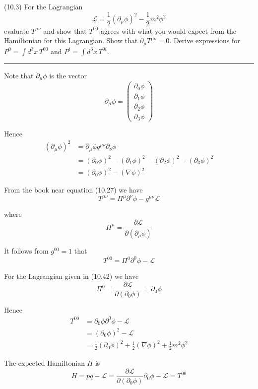 \documentclass[12pt]{article}
\begin{document}
(10.3)
For the Lagrangian
\begin{equation*}
\mathcal L=\frac{1}{2}(\partial_\mu\phi)^2-\frac{1}{2}m^2\phi^2
\tag{10.42}
\end{equation*}
evaluate $T^{\mu\nu}$ and show that $T^{00}$ agrees with what
you would expect from the Hamiltonian for this Lagrangian.
Show that $\partial_\mu T^{\mu\nu}=0$. Derive expressions
for $P^0=\int d^3x\,T^{00}$ and $P^i=\int d^3x\,T^{0i}$.

\bigskip
\hrule

\bigskip
Note that $\partial_\mu\phi$ is the vector
\begin{equation*}
\partial_\mu\phi=\begin{pmatrix}
\partial_0\phi
\\
\partial_1\phi
\\
\partial_2\phi
\\
\partial_3\phi
\end{pmatrix}
\end{equation*}

Hence
\begin{align*}
(\partial_\mu\phi)^2
&=\partial_\mu\phi g^{\mu\nu}\partial_\nu\phi
\\
&=(\partial_0\phi)^2-(\partial_1\phi)^2-(\partial_2\phi)^2-(\partial_3\phi)^2
\\
&=(\partial_0\phi)^2-(\nabla\phi)^2
\end{align*}

From the book near equation (10.27) we have
\begin{equation*}
T^{\mu\nu}=\Pi^\mu\partial^\nu\phi-g^{\mu\nu}\mathcal L
\end{equation*}

where
\begin{equation*}
\Pi^\mu=\frac{\partial\mathcal L}{\partial(\partial_\mu\phi)}
\end{equation*}

It follows from $g^{00}=1$ that
\begin{equation*}
T^{00}=\Pi^0\partial^0\phi-\mathcal L
\end{equation*}

For the Lagrangian given in (10.42) we have
\begin{equation*}
\Pi^0=\frac{\partial\mathcal L}{\partial(\partial_0\phi)}=\partial_0\phi
\end{equation*}

Hence
\begin{align*}
T^{00}
&=\partial_0\phi\partial^0\phi-\mathcal L
\\
&=(\partial_0\phi)^2-\mathcal L
\\
&=\frac{1}{2}(\partial_0\phi)^2+\frac{1}{2}(\nabla\phi)^2+\frac{1}{2}m^2\phi^2
\end{align*}

The expected Hamiltonian $H$ is
\begin{equation*}
H=p\dot q-\mathcal L
=\frac{\partial\mathcal L}{\partial(\partial_0\phi)}\partial_0\phi-\mathcal L
=T^{00}
\end{equation*}
\end{document}
